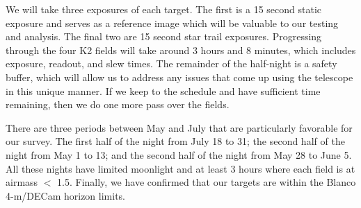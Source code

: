 \documentclass[11pt]{article}
\begin{document}
We will take three exposures of each target. The first is a 15 second static exposure and serves as a reference image which will be valuable to our testing and analysis. The final two are 15 second star trail exposures. Progressing through the four K2 fields will take around 3 hours and 8 minutes, which includes exposure, readout, and slew times. The remainder of the half-night is a safety buffer, which will allow us to address any issues that come up using the telescope in this unique manner. If we keep to the schedule and have sufficient time remaining, then we do one more pass over the fields.

There are three periods between May and July that are particularly favorable for our survey. The first half of the night from July 18 to 31; the second half of the night from May 1 to 13; and the second half of the night from May 28 to June 5. All these nights have limited moonlight and at least 3 hours where each field is at airmass $<$ 1.5. Finally, we have confirmed that our targets are within the Blanco 4-m/DECam horizon limits.



\end{document}
